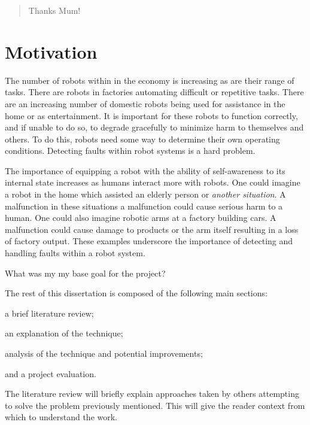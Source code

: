 \documentclass[11pt, a4paper]{report}
\begin{document}
\renewcommand{\abstractname}{Acknowledgments}
\begin{abstract}
  Thanks Mum!
\end{abstract}

\chapter{Motivation}
\label{cha:motivation}
The number of robots within in the economy is increasing as are their
range of tasks. There are robots in factories automating difficult or
repetitive tasks. There are an increasing number of domestic robots
being used for assistance in the home or as entertainment. It is
important for these robots to function correctly, and if unable to do
so, to degrade gracefully to minimize harm to themselves and others.
To do this, robots need some way to determine their own operating
conditions. Detecting faults within robot systems is a hard problem.

The importance of equipping a robot with the ability of self-awareness
to its internal state increases as humans interact more with robots.
One could imagine a robot in the home which assisted an elderly person
or \textit{another situation}. A malfunction in these situations a
malfunction could cause serious harm to a human. One could also
imagine robotic arms at a factory building cars. A malfunction could
cause damage to products or the arm itself resulting in a loss of
factory output. These examples underscore the importance of detecting
and handling faults within a robot system.


\noindent What was my my base goal for the project?

The rest of this dissertation is composed of the following main
sections:
\begin{inparaenum}
\item a brief literature review;
\item an explanation of the technique;
\item analysis of the technique and potential improvements;
\item and a project evaluation.
\end{inparaenum} The literature review will briefly explain approaches
taken by others attempting to solve the problem previously mentioned.
This will give the reader context from which to understand the work.
\end{document}
